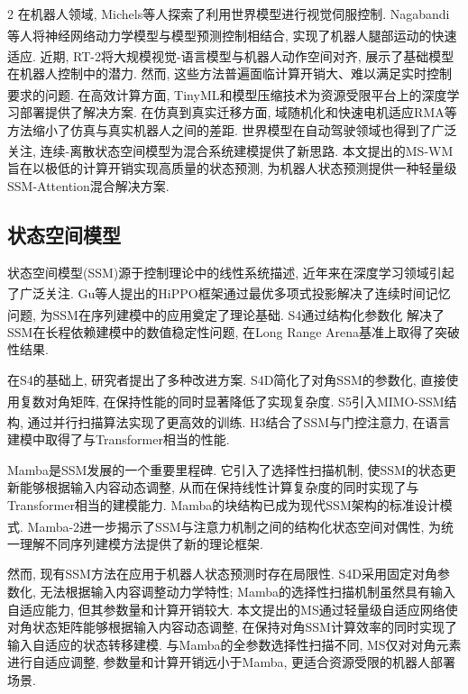 \begin{multicols}{2}
在机器人领域, Michels等人探索了利用世界模型进行视觉伺服控制.
Nagabandi等人\textsuperscript{\cite{12,13,14}}将神经网络动力学模型与模型预测控制相结合, 实现了机器人腿部运动的快速适应.
近期, RT-2\textsuperscript{\cite{5}}将大规模视觉-语言模型与机器人动作空间对齐,
展示了基础模型在机器人控制中的潜力.
然而, 这些方法普遍面临计算开销大、难以满足实时控制要求的问题.
在高效计算方面, TinyML\textsuperscript{\cite{15}}和模型压缩技术为资源受限平台上的深度学习部署提供了解决方案.
在仿真到真实迁移方面, 域随机化和快速电机适应RMA等方法缩小了仿真与真实机器人之间的差距.
世界模型在自动驾驶领域也得到了广泛关注\textsuperscript{\cite{16}}, 连续-离散状态空间模型为混合系统建模提供了新思路.
本文提出的MS-WM旨在以极低的计算开销实现高质量的状态预测,
为机器人状态预测提供一种轻量级SSM-Attention混合解决方案.

\subsection{状态空间模型}

状态空间模型(SSM)源于控制理论中的线性系统描述,
近年来在深度学习领域引起了广泛关注.
Gu等人\textsuperscript{\cite{17}}提出的HiPPO框架通过最优多项式投影解决了连续时间记忆问题,
为SSM在序列建模中的应用奠定了理论基础.
S4\textsuperscript{\cite{6}}通过结构化参数化
解决了SSM在长程依赖建模中的数值稳定性问题,
在Long Range Arena基准上取得了突破性结果.

在S4的基础上, 研究者提出了多种改进方案.
S4D简化了对角SSM的参数化, 直接使用复数对角矩阵,
在保持性能的同时显著降低了实现复杂度.
S5\textsuperscript{\cite{18}}引入MIMO-SSM结构, 通过并行扫描算法实现了更高效的训练.
H3\textsuperscript{\cite{19}}结合了SSM与门控注意力, 在语言建模中取得了与Transformer相当的性能.

Mamba是SSM发展的一个重要里程碑.
它引入了选择性扫描机制, 使SSM的状态更新能够根据输入内容动态调整,
从而在保持线性计算复杂度的同时实现了与Transformer相当的建模能力.
Mamba的块结构已成为现代SSM架构的标准设计模式.
Mamba-2\textsuperscript{\cite{9}}进一步揭示了SSM与注意力机制之间的结构化状态空间对偶性,
为统一理解不同序列建模方法提供了新的理论框架.

然而, 现有SSM方法在应用于机器人状态预测时存在局限性.
S4D采用固定对角参数化, 无法根据输入内容调整动力学特性;
Mamba的选择性扫描机制虽然具有输入自适应能力, 但其参数量和计算开销较大.
本文提出的MS通过轻量级自适应网络使对角状态矩阵能够根据输入内容动态调整,
在保持对角SSM计算效率的同时实现了输入自适应的状态转移建模.
与Mamba的全参数选择性扫描不同, MS仅对对角元素进行自适应调整,
参数量和计算开销远小于Mamba, 更适合资源受限的机器人部署场景.


\end{multicols}
